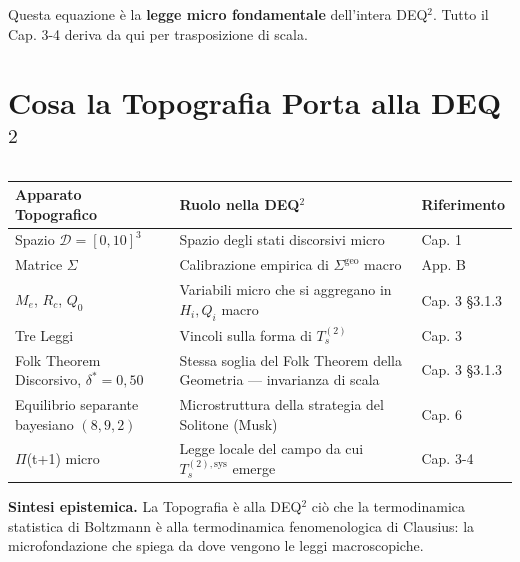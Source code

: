 \Proved{} Questa equazione è la \textbf{legge micro fondamentale}
dell'intera DEQ$^2$. Tutto il Cap. 3-4 deriva da qui per trasposizione di
scala.



\section{Cosa la Topografia Porta alla
DEQ$^2$}\label{cosa-la-topografia-porta-alla-dequxb2}

{\def\LTcaptype{none} %
{\small\begin{longtable}[]{@{}
  >{\raggedright\arraybackslash}p{}
  >{\raggedright\arraybackslash}p{}
  >{\raggedright\arraybackslash}p{}@{}}
\toprule\noalign{}
\begin{minipage}[b]{\linewidth}\raggedright
Apparato Topografico
\end{minipage} & \begin{minipage}[b]{\linewidth}\raggedright
Ruolo nella DEQ$^2$
\end{minipage} & \begin{minipage}[b]{\linewidth}\raggedright
Riferimento
\end{minipage} \\
\midrule\noalign{}
\endhead
\bottomrule\noalign{}
\endlastfoot
Spazio \(\mathcal{D} = [0, 10]^3\) & Spazio degli stati discorsivi micro
& Cap. 1 \\
Matrice \(\Sigma\) & Calibrazione empirica di \(\Sigma^{\text{geo}}\)
macro & App. B \\
\(M_e\), \(R_c\), \(Q_0\) & Variabili micro che si aggregano in
\(H_i, Q_i\) macro & Cap. 3 \S{}3.1.3 \\
Tre Leggi & Vincoli sulla forma di \(T_s^{(2)}\) & Cap. 3 \\
Folk Theorem Discorsivo, \(\delta^* = 0{,}50\) & Stessa soglia del Folk
Theorem della Geometria --- invarianza di scala & Cap. 3 \S{}3.1.3 \\
Equilibrio separante bayesiano \((8, 9, 2)\) & Microstruttura della
strategia del Solitone (Musk) & Cap. 6 \\
$\Pi$(t+1) micro & Legge locale del campo da cui \(T_s^{(2),\text{sys}}\)
emerge & Cap. 3-4 \\
\end{longtable}}
}

\Hypoth{} \textbf{Sintesi epistemica.} La Topografia è alla DEQ$^2$ ciò che
la termodinamica statistica di Boltzmann è alla termodinamica
fenomenologica di Clausius: la microfondazione che spiega da dove
vengono le leggi macroscopiche.




